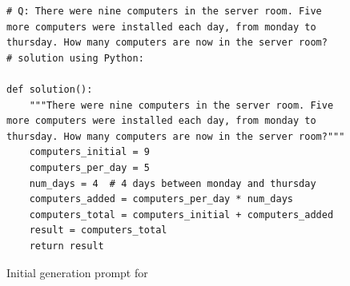 \begin{figure}
    \begin{verbatim}
# Q: There were nine computers in the server room. Five more computers were installed each day, from monday to thursday. How many computers are now in the server room?
# solution using Python:

def solution():
    """There were nine computers in the server room. Five more computers were installed each day, from monday to thursday. How many computers are now in the server room?"""
    computers_initial = 9
    computers_per_day = 5
    num_days = 4  # 4 days between monday and thursday
    computers_added = computers_per_day * num_days
    computers_total = computers_initial + computers_added
    result = computers_total
    return result
\end{verbatim}
\caption{Initial generation prompt for \gsm}
\label{fig:prompt:gsm:init}
\end{figure}